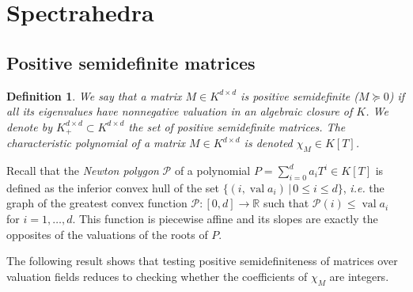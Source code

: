 \documentclass[a4paper,oneside,11pt]{article}
\newtheorem{definition}[theorem]{Definition}
\newcommand{\R}{\mathbb{R}} %
\DeclareMathOperator{\val}{val}
\begin{document}
\section{Spectrahedra}

\subsection{Positive semidefinite matrices}
\newcommand\Mat{Positive semidefinite matrix }
\newcommand\mats{positive semidefinite matrices }
\newcommand\Mats{positive semidefinite matrices }

\begin{definition}
  We say that a matrix $M \in K^{d \times d}$ is \emph{positive semidefinite} ($M \succeq 0$)
  if all its eigenvalues have nonnegative valuation in an algebraic closure of $K$.
  We denote by $K^{d \times d}_+ \subset K^{d\times d}$ the set of positive semidefinite matrices.
  The characteristic polynomial of a matrix $M \in K^{d\times d}$ is denoted $\chi_M \in K[T]$.
\end{definition}

Recall that the \emph{Newton polygon} $\mathcal{P}$ of a polynomial $P = \sum_{i=0}^{d} a_i T^i \in K[T]$ is
defined as the inferior convex hull of the set $\{(i, \val a_i) \,|\, 0 \le i \le d\}$, {\it i.e.} the
graph of the greatest convex function $\mathcal{P} : [0,d] \to \R$ such that $\mathcal{P}(i) \leq \val a_i$
for $i=1,\ldots,d$. This function is piecewise affine and its slopes are exactly the opposites of the valuations
of the roots of $P$.

The following result shows that testing positive semidefiniteness of matrices over
valuation fields reduces to checking whether the coefficients of $\chi_M$ are integers.
\end{document}
